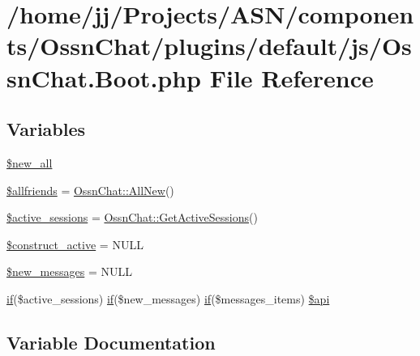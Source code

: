 \hypertarget{_ossn_chat_8_boot_8php}{}\section{/home/jj/\+Projects/\+A\+S\+N/components/\+Ossn\+Chat/plugins/default/js/\+Ossn\+Chat.Boot.\+php File Reference}
\label{_ossn_chat_8_boot_8php}
\subsection*{Variables}
\begin{DoxyCompactItemize}
\item 
\hyperlink{_ossn_chat_8_boot_8php_a4bafc097f2212902dbd94a8ae24af73a}{\$new\+\_\+all}
\item 
\hyperlink{_ossn_chat_8_boot_8php_a2ff54b9232fc4b350ca30dedb317056b}{\$allfriends} = \hyperlink{class_ossn_chat_a2cf575b75a8fd733d3a1dc0548ece5d6}{Ossn\+Chat\+::\+All\+New}()
\item 
\hyperlink{_ossn_chat_8_boot_8php_a6681a273192c19abe6db05e410162e13}{\$active\+\_\+sessions} = \hyperlink{class_ossn_chat_ab7560516e7bbdae5aa7529f3d9fa870a}{Ossn\+Chat\+::\+Get\+Active\+Sessions}()
\item 
\hyperlink{_ossn_chat_8_boot_8php_a9612ca0b4b59a97699c0618974905194}{\$construct\+\_\+active} = N\+U\+LL
\item 
\hyperlink{_ossn_chat_8_boot_8php_a94aa1be9d7b9a51dd2d68f4829b73f92}{\$new\+\_\+messages} = N\+U\+LL
\item 
\hyperlink{jquery_8tokeninput_8js_ad8dd46a3cbc004569e34401e9e71771a}{if}(\$active\+\_\+sessions) \hyperlink{jquery_8tokeninput_8js_ad8dd46a3cbc004569e34401e9e71771a}{if}(\$new\+\_\+messages) \hyperlink{jquery_8tokeninput_8js_ad8dd46a3cbc004569e34401e9e71771a}{if}(\$messages\+\_\+items) \hyperlink{_ossn_chat_8_boot_8php_aeb1d7d0f6fa007c1c1221d21eb7e5d1b}{\$api}
\end{DoxyCompactItemize}


\subsection{Variable Documentation}
